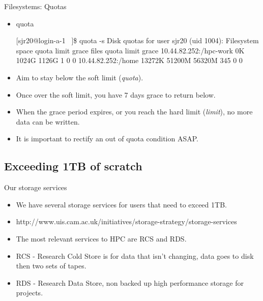 \begin{frame}[fragile]{Filesystems: Quotas}
\begin{itemize}
\item{quota}
\begin{semiverbatim}
\tiny
[sjr20@login-a-1 ~]\$ quota -s
Disk quotas for user sjr20 (uid 1004): 
     Filesystem   space   quota   limit   grace   files   quota   limit   grace
10.44.82.252:/hpc-work
                     0K   1024G   1126G               1       0       0        
10.44.82.252:/home
                 13272K  51200M  56320M             345       0       0        
\end{semiverbatim}
\item<1-|handout:1->{\alert{Aim to stay below the soft limit (\emph{quota}).}}
\item<2-|handout:1->{\alert{Once over the soft limit, you have 7 days grace to return below.}}
\item<3-|handout:2>{\alert{When the grace period expires, or you reach the hard limit (\emph{limit}), no more data can be written.}}
\item<4-|handout:2>{\alert{It is important to rectify an out of quota condition ASAP.}}
\end{itemize}
\end{frame}

\subsection{Exceeding 1TB of scratch}
\begin{frame}{Our storage services}
\begin{itemize}
\item{We have several storage services for users that need to exceed 1TB.}
\pause
\item{\alert{http://www.uis.cam.ac.uk/initiatives/storage-strategy/storage-services}}
\item{The most relevant services to HPC are RCS and RDS.}
\item{RCS - Research Cold Store is for data that isn't changing, data goes to disk then two sets of tapes.}
\item{RDS - Research Data Store, non backed up high performance storage for projects.}
\end{itemize}
\end{frame}

